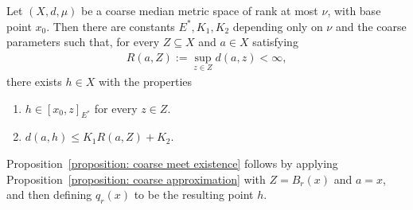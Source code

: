\documentclass[12pt,reqno]{amsart}
\numberwithin{equation}{section}
\begin{document}
\begin{proposition}\label{proposition: coarse approximation}
    Let $(X,d,\mu)$ be a coarse median metric space of rank at most $\nu$, with base point $x_0$. Then there are constants $E^*,K_1,K_2$ depending only on $\nu$ and the coarse parameters such that, for every $Z\subseteq X$ and $a\in X$ satisfying
    \begin{align*}
        R(a,Z):=\sup_{z\in Z}d(a,z)<\infty,
    \end{align*}
    there exists $h\in X$ with the properties
    \begin{enumerate}[label=(P\arabic*)]
        \item\label{property: inclusion with E*} $h\in [x_0,z]_{E^*}$ for every $z\in Z$.
        \item\label{property: distance bound with K_1K_2} $d(a,h)\le K_1R(a,Z)+K_2$.
    \end{enumerate}
\end{proposition}
Proposition~\ref{proposition: coarse meet existence} follows by applying Proposition~\ref{proposition: coarse approximation} with $Z=B_r(x)$ and $a=x$, and then defining $q_r(x)$ to be the resulting point $h$.
\end{document}
